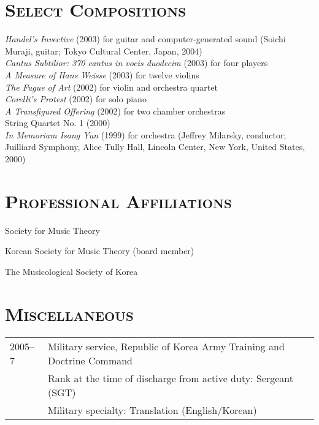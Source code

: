 \documentclass[letter,11pt,draft]{article}
\begin{document}
  \vspace{2.5mm}
  
  \section*{\textsc{Select Compositions}}
  
  \begin{hangparas}{15pt}{1}
    \textit{Handel’s Invective} (2003) for guitar and computer-generated sound (Soichi Muraji, guitar; Tokyo Cultural Center, Japan, 2004)\\[2mm]
  
    \textit{Cantus Subtilior: 370 cantus in vocis duodecim} (2003) for four players\\[2mm]
  
    \textit{A Measure of Hans Weisse} (2003) for twelve violins\\[2mm]
  
    \textit{The Fugue of Art} (2002) for violin and orchestra quartet\\[2mm]
  
    \textit{Corelli’s Protest} (2002) for solo piano\\[2mm]
  
    \textit{A Transfigured Offering} (2002) for two chamber orchestras\\[2mm]
  
    String Quartet No. 1 (2000)\\[2mm]
  
    \textit{In Memoriam Isang Yun} (1999) for orchestra (Jeffrey Milarsky, conductor; Juilliard Symphony, Alice Tully Hall, Lincoln Center, New York, United States, 2000)
  \end{hangparas}
  
  \vspace{5mm}
  
  \section*{\textsc{Professional Affiliations}}
  
  Society for Music Theory
  
  \noindent Korean Society for Music Theory (board member)
  
  \noindent The Musicological Society of Korea
  
  \section*{\textsc{Miscellaneous}}
  
  \hspace*{-0.25cm}
  \begin{tabular}{p{2.5cm} l}
    2005–7 & Military service, Republic of Korea Army Training and Doctrine Command\\
    & Rank at the time of discharge from active duty: Sergeant (SGT)\\
    & Military specialty: Translation (English/Korean)
  \end{tabular}
\end{document}
